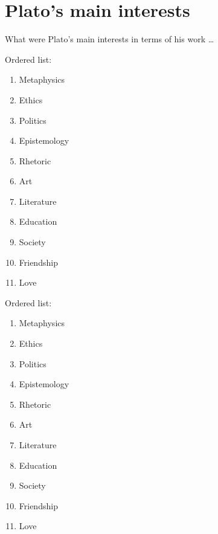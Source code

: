 \documentclass[11pt]{article}
\begin{document}
	\section{Plato's main interests} %
		What were Plato's main interests in terms of his work \ldots



		Ordered list:
		\begin{enumerate}
    		\item Metaphysics
			\item Ethics
			\item Politics
			\item Epistemology
			\item Rhetoric
			\item Art
			\item Literature
			\item Education
			\item Society
			\item Friendship
			\item Love
		\end{enumerate}

		Ordered list:
		\begin{enumerate}
    		\item Metaphysics
			\item Ethics
			\item Politics
			\item Epistemology
			\item Rhetoric
			\item Art
			\item Literature
			\item Education
			\item Society
			\item Friendship
			\item Love
		\end{enumerate}
\end{document}
